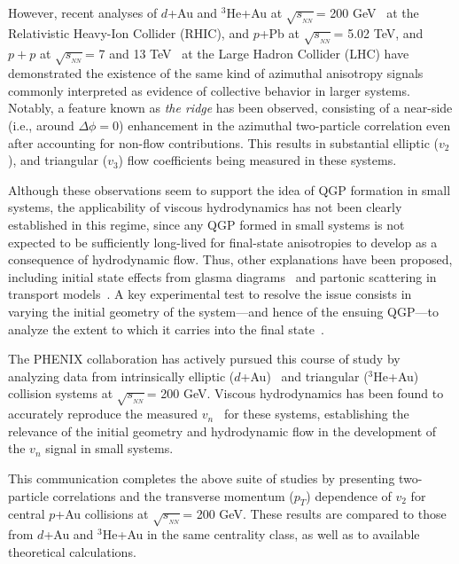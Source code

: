 \documentclass[%
reprint,
showpacs,preprintnumbers,
 amsmath,amssymb,
 aps,
]{revtex4-1}
\newcommand{\pt}{\mbox{$p_T$}\xspace}
\newcommand{\sqsn}{\mbox{$\sqrt{s_{_{NN}}}$}\xspace}
\newcommand{\dau}{\mbox{$d$+Au}\xspace}
\newcommand{\pau}{\mbox{$p$+Au}\xspace}
\newcommand{\hau}{\mbox{$^3\text{He}$+Au}\xspace}
\newcommand{\ppb}{\mbox{$p$+Pb}\xspace}
\begin{document}
However, recent analyses of \dau and \hau at \sqsn = 200 GeV~\cite{adare_measurement_2014,Adamczyk:2014fcx,PhysRevLett.115.142301} at the Relativistic Heavy-Ion Collider (RHIC), and \ppb at \sqsn = 5.02 TeV, and $p+p$ at \sqsn = 7 and 13 TeV~\cite{alice_long_2013,atlas_observation_2012,cms_observation_2012,Khachatryan:2015lva,Aad:2015gqa} at the Large Hadron Collider (LHC) have demonstrated the existence of the same kind of azimuthal anisotropy signals commonly interpreted as evidence of collective behavior in larger systems. Notably, a feature known as \textit{the ridge} has been observed, consisting of a near-side (i.e., around $\Delta \phi = 0$) enhancement in the azimuthal two-particle correlation even after accounting for non-flow contributions. This results in substantial elliptic ($v_2$), and triangular ($v_3$) flow coefficients being measured in these systems.

Although these observations seem to support the idea of QGP formation in small systems, the applicability of viscous hydrodynamics has not been clearly established in this regime, since any QGP formed in small systems is not expected to be sufficiently long-lived for final-state anisotropies to develop as a consequence of hydrodynamic flow. Thus, other explanations have been proposed, including initial state effects from glasma diagrams~\cite{dusling_azimuthal_2012} and partonic scattering in transport models~\cite{bzdak_elliptic_2014,ma_long-range_2014,Koop:2015wea}. A key experimental test to resolve the issue consists in varying the initial geometry of the system---and hence of the ensuing QGP---to analyze the extent to which it carries into the final state~\cite{nagle_exploiting_2013}. 

The PHENIX collaboration has actively pursued this course of study by analyzing data from intrinsically elliptic (\dau)~\cite{adare_measurement_2014,PhysRevLett.111.212301} and triangular (\hau)~\cite{Adare:2015ctn} collision systems at \sqsn = 200 GeV. Viscous hydrodynamics has been found to accurately reproduce the measured $v_n$~\cite{Romatschke:2015gxa} for these systems, establishing the relevance of the initial geometry and hydrodynamic flow in the development of the $v_n$ signal in small systems.

This communication completes the above suite of studies by presenting two-particle correlations and the transverse momentum (\pt) dependence of $v_2$ for central \pau collisions at \sqsn = 200 GeV. These results are compared to those from \dau and \hau in the same centrality class, as well as to available theoretical calculations.
\end{document}
